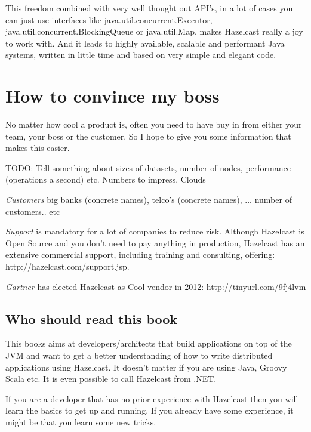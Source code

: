 This freedom combined with very well thought out API's, in a lot of cases you can just use interfaces like java.util.concurrent.Executor, java.util.concurrent.BlockingQueue or java.util.Map, makes Hazelcast really a joy to work with. And it leads to highly available, scalable and performant Java systems, written in little time and based on very simple and elegant code.

\section{How to convince my boss}
No matter how cool a product is, often you need to have buy in from either your team, your boss or the customer. So I hope to give you some information that makes this easier.

TODO: Tell something about sizes of datasets, number of nodes, performance (operations a second) etc. Numbers to impress. Clouds

\emph{Customers} big banks (concrete names), telco's (concrete names), ... number of customers.. etc

\emph{Support} is mandatory for a lot of companies to reduce risk. Although Hazelcast is Open Source and you don't need to pay anything in production, Hazelcast has an extensive commercial support, including training and consulting,  offering: http://hazelcast.com/support.jsp. 

\emph{Gartner} has elected Hazelcast as Cool vendor in 2012: http://tinyurl.com/9fj4lvm

\subsection*{Who should read this book}
This books aims at developers/architects that build applications on top of the JVM and want to get a better understanding of how to write distributed applications using Hazelcast. It doesn't matter if you are using Java, Groovy Scala etc. It is even possible to call Hazelcast from .NET.

If you are a developer that has no prior experience with Hazelcast then you will learn the basics to get up and running. If you already have some experience, it might be that you learn some new tricks.

